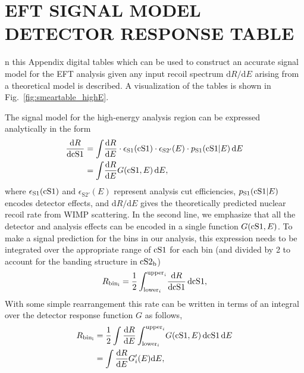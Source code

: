 %
%

\chapter{EFT SIGNAL MODEL DETECTOR RESPONSE TABLE}
\label{app:response_table}

n this Appendix digital tables which can be used to construct an accurate signal model for the EFT analysis given any input recoil spectrum $\mathrm{d}R/\mathrm{d}E$ arising from a theoretical model is described. A visualization of the tables is shown in Fig.~\ref{fig:smeartable_highE}.

The signal model for the high-energy analysis region can be expressed analytically in the form
%
\begin{align}
\label{eq:high2D}
  \frac{\mathrm{d} R}{\mathrm{d}\mathrm{cS1}} &= \int \! \frac{\mathrm{d}R}{\mathrm{d}E} \cdot \epsilon_\mathrm{S1}(\mathrm{cS1}) \cdot \epsilon_\mathrm{S2'}(E) \cdot p_\mathrm{S1}(\mathrm{\mathrm{cS1}}|E) \, \mathrm{d}E \\
  &= \int \! \frac{\mathrm{d}R}{\mathrm{d}E} G(\mathrm{cS1},E) \, \mathrm{d}E,
\end{align}
%
where $\epsilon_\mathrm{S1}(\mathrm{cS1})$ and $\epsilon_\mathrm{S2'}(E)$ represent analysis cut efficiencies, $p_\mathrm{S1}(\mathrm{\mathrm{cS1}}|E)$ encodes detector effects, and $\mathrm{d}R/\mathrm{d}E$ gives the theoretically predicted nuclear recoil rate from WIMP scattering. In the second line, we emphasize that all the detector and analysis effects can be encoded in a single function $G(\mathrm{cS1},E)$. To make a signal prediction for the bins in our analysis, this expression needs to be integrated over the appropriate range of $\mathrm{cS1}$ for each bin (and divided by 2 to account for the banding structure in $\mathrm{cS2}_\mathrm{b}$)
%
\begin{equation}
  R_\mathrm{bin_i} = \frac{1}{2}\int_{\mathrm{lower}_i}^{\mathrm{upper}_i} \! \frac{\mathrm{d} R}{\mathrm{d}\mathrm{cS1}} \, \mathrm{d}\mathrm{cS1},
\end{equation}
%
With some simple rearrangement this rate can be written in terms of an integral over the detector response function $G$ as follows,
%
\begin{align}
  R_\mathrm{bin_i} &= \frac{1}{2}\int\frac{\mathrm{d} R}{\mathrm{d}E}\int_{\mathrm{lower}_i}^{\mathrm{upper}_i} \! G(\mathrm{cS1},E) \, \mathrm{d}\mathrm{cS1} \, \mathrm{d}E \\
 &= \int\frac{\mathrm{d} R}{\mathrm{d}E} G'_i(E) \mathrm{d}E,
\end{align}

